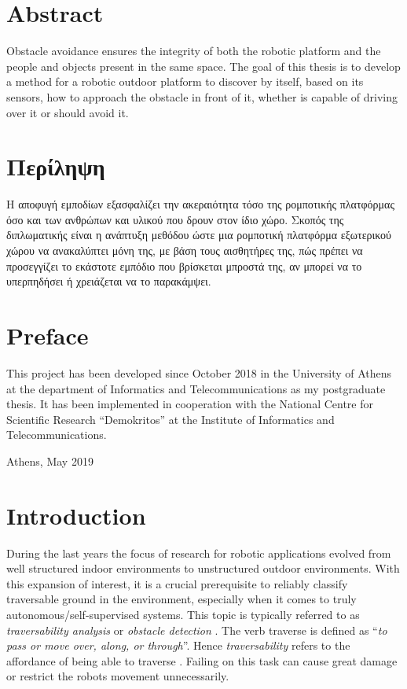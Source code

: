 \documentclass[12pt,a4paper,table,dvipsnames,tikz]{report}
\newcommand{\defn}[1]{\enquote{\textit{#1}}}
\newcommand{\term}{\textit}
\begin{document}
	
	
	\chapter*{Abstract}
	Obstacle avoidance ensures the integrity of both the robotic platform and the 
	people and objects present in the same space. The goal of this thesis is to 
	develop a method for a robotic outdoor platform to discover by itself, based 
	on its sensors, how to approach the obstacle in front of it, whether is capable 
	of driving over it or should avoid it.
	
	\chapter*{Περίληψη}
	Η αποφυγή εμποδίων εξασφαλίζει την ακεραιότητα τόσο της ρομποτικής πλατφόρμας 
	όσο και των ανθρώπων και υλικού που δρουν στον ίδιο χώρο. Σκοπός της διπλωματικής 
	είναι η ανάπτυξη μεθόδου ώστε μια ρομποτική πλατφόρμα εξωτερικού χώρου να 
	ανακαλύπτει μόνη της, με βάση τους αισθητήρες της, πώς πρέπει να προσεγγίζει 
	το εκάστοτε εμπόδιο που βρίσκεται μπροστά της, αν μπορεί να το υπερπηδήσει ή 
	χρειάζεται να το παρακάμψει.
	
	{
		\hypersetup{linkcolor=black}
		\tableofcontents
		\listoftables
		\listoffigures
	}
	
	\chapter*{Preface}
	This project has been developed since October 2018 in the University of Athens at 
	the department of Informatics and Telecommunications as my postgraduate thesis. It 
	has been implemented in cooperation with the National Centre for Scientific Research 
	\enquote{Demokritos} at the Institute of Informatics and Telecommunications.\\
	\begin{flushright}
		Athens, May 2019
	\end{flushright}
	
	
	\chapter{Introduction}
	\label{sec:intro}
	
	During the last years the focus of research for robotic applications evolved 
	from well structured indoor environments to unstructured outdoor environments. 
	With this expansion of interest, it is a crucial prerequisite to reliably 
	classify traversable ground in the environment, especially when it comes to 
	truly autonomous/self-supervised systems. This topic is typically referred to as 
	\term{traversability analysis} or \term{obstacle detection} \citep{Suger}. The 
	verb traverse is defined as \defn{to pass or move over, along, or through}. 
	Hence \term{traversability} refers to the affordance of being able to traverse 
	\citep{Ugur}. Failing on this task can cause great damage or restrict the robots 
	movement unnecessarily.
	\\
	
\end{document}
